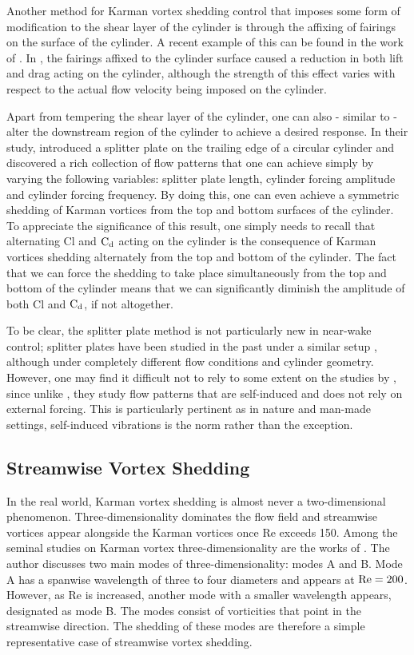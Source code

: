 \documentclass[oneside]{utmthesis}
\begin{document}
Another method for Karman vortex shedding control that imposes some form of modification to the shear layer of the cylinder is through the affixing of fairings on the surface of the cylinder. A recent example of this can be found in the work of \citet{Kang2020}. In \citet{Kang2020}, the fairings affixed to the cylinder surface caused a reduction in both lift and drag acting on the cylinder, although the strength of this effect varies with respect to the actual flow velocity being imposed on the cylinder.

Apart from tempering the shear layer of the cylinder, one can also - similar to \citet{Yokoi2016} - alter the downstream region of the cylinder to achieve a desired response. In their study, \citet{Yokoi2016} introduced a splitter plate on the trailing edge of a circular cylinder and discovered a rich collection of flow patterns that one can achieve simply by varying the following variables: splitter plate length, cylinder forcing amplitude and cylinder forcing frequency. By doing this, one can even achieve a symmetric shedding of Karman vortices from the top and bottom surfaces of the cylinder. To appreciate the significance of this result, one simply needs to recall that alternating Cl and $\text{C}_{\text{d}}$ acting on the cylinder is the consequence of Karman vortices shedding alternately from the top and bottom of the cylinder. The fact that we can force the shedding to take place simultaneously from the top and bottom of the cylinder means that we can significantly diminish the amplitude of both Cl and $\text{C}_{\text{d}}$, if not altogether.

To be clear, the splitter plate method is not particularly new in near-wake control; splitter plates have been studied in the past under a similar setup \citep{MatAli2011,MatAli2012}, although under completely different flow conditions and cylinder geometry. However, one may find it difficult not to rely to some extent on the studies by \citet{MatAli2011,MatAli2012}, since unlike \citet{Yokoi2016}, they study flow patterns that are self-induced and does not rely on external forcing. This is particularly pertinent as in nature and man-made settings, self-induced vibrations is the norm rather than the exception.

\subsection{Streamwise Vortex Shedding} \label{ssec:svShedding}
In the real world, Karman vortex shedding is almost never a two-dimensional phenomenon. Three-dimensionality dominates the flow field and streamwise vortices appear alongside the Karman vortices once Re exceeds 150. Among the seminal studies on Karman vortex three-dimensionality are the works of \citet{Williamson1996a,Williamson1996b}. The author discusses two main modes of three-dimensionality: modes A and B. Mode A has a spanwise wavelength of three to four diameters and appears at $\text{Re} = 200$. However, as Re is increased, another mode with a smaller wavelength appears, designated as mode B. The modes consist of vorticities that point in the streamwise direction. The shedding of these modes are therefore a simple representative case of streamwise vortex shedding.
\end{document}
